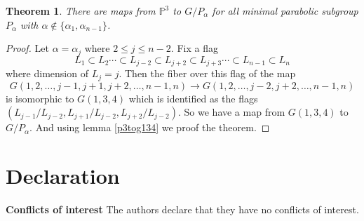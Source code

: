 \documentclass[a4paper,11pt]{amsart}
\newtheorem{theorem}{Theorem}[section]
\begin{document}
\begin{theorem} There are maps from $\mathbb{P}^3$ to $G/P_{\alpha}$ for all minimal parabolic subgroup  $P_{\alpha}$ with  ${\alpha} \notin \{ {\alpha_{1}, \alpha_{n-1}} \}$.
\end{theorem}

\begin{proof} Let $\alpha = \alpha_j$ where $2 \leq j \leq n-2$. Fix a flag
 \[ L_1 \subset L_2 \cdots \subset L_{j-2} \subset L_{j+2} \subset L_{j+3} \cdots  \subset L_{n-1} \subset L_n 
 \] 
 where dimension of $L_j = j$.
Then the fiber over this flag of the map 
\[ G(1,2,\ldots,j-1,j+1,j+2,\ldots,n-1,n) \longrightarrow G(1,2,\ldots,j-2, j+2,\ldots, n-1, n )
\]
is isomorphic to $G(1,3,4)$ which is identified as the flags $(L_{j-1}/L_{j-2},L_{j+1}/L_{j-2},L_{j+2}/L_{j-2})$. So we have a map from $G(1,3,4)$ to $G/P_{\alpha}$. And using lemma \ref{p3tog134} we proof the theorem.

\end{proof}


\section{Declaration}
\textbf{Conflicts of interest} 
The authors declare that they have no conflicts of interest.




\end{document}
